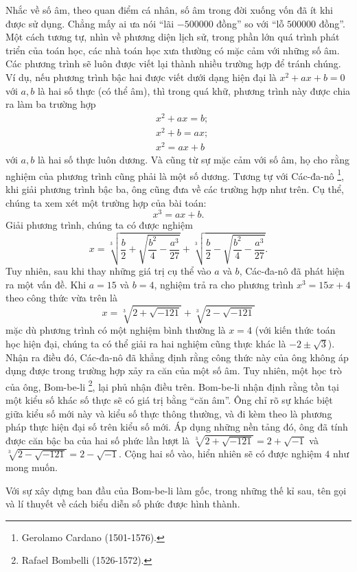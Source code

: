 \documentclass[a4paper, titlepage, openany]{book}
\newcommand\dblquote[1]{\textquotedblleft #1\textquotedblright}
\numberwithin{equation}{chapter}
\begin{document}
Nhắc về số âm, theo quan điểm cá nhân, số âm trong đời xuống vốn đã ít khi được sử dụng. Chẳng mấy ai ưa nói \dblquote{lãi $-500000$ đồng} so với \dblquote{lỗ $500000$ đồng}. Một cách tương tự, nhìn về phương diện lịch sử, trong phần lớn quá trình phát triển của toán học, các nhà toán học xưa thường có mặc cảm với những số âm. Các phương trình sẽ luôn được viết lại thành nhiều trường hợp để tránh chúng. Ví dụ, nếu phương trình bậc hai được viết dưới dạng hiện đại là $x^2 + ax+b=0$ với $a,b$ là hai số thực (có thể âm), thì trong quá khữ, phương trình này được chia ra làm ba trường hợp
\begin{align*}
   &x^2+ax = b;\\
   &x^2+b =ax;\\
   &x^2 =ax+b
\end{align*}
với $a,b$ là hai số thực luôn dương. Và cũng từ sự mặc cảm với số âm, họ cho rằng nghiệm của phương trình cũng phải là một số dương. Tương tự với Các-đa-nô \footnote{Gerolamo Cardano (1501-1576).}, khi giải phương trình bậc ba, ông cũng đưa về các trường hợp như trên. Cụ thể, chúng ta xem xét một trường hợp của bài toán: $$x^3 = ax+b.$$ Giải phương trình, chúng ta có được nghiệm $$x=\sqrt[3]{\frac{b}{2} + \sqrt{\frac{b^2}{4}-\frac{a^3}{27}}}+\sqrt[3]{\frac{b}{2} - \sqrt{\frac{b^2}{4}-\frac{a^3}{27}}}.$$ Tuy nhiên, sau khi thay những giá trị cụ thể vào $a$ và $b$, Các-đa-nô đã phát hiện ra một vấn đề. Khi $a=15$ và $b=4$, nghiệm trả ra cho phương trình $x^3 = 15x+4$ theo công thức vừa trên là $$x=\sqrt[3]{2+\sqrt{-121}}+\sqrt[3]{2-\sqrt{-121}}$$ mặc dù phương trình có một nghiệm bình thường là $x=4$ (với kiến thức toán học hiện đại, chúng ta có thể giải ra hai nghiệm cũng thực khác là $-2 \pm \sqrt{3}$). Nhận ra điều đó, Các-đa-nô đã khẳng định rằng công thức này của ông không áp dụng được trong trường hợp xảy ra căn của một số âm. Tuy nhiên, một học trò của ông, Bom-be-li \footnote{Rafael Bombelli (1526-1572).}, lại phủ nhận điều trên. Bom-be-li nhận định rằng tồn tại một kiểu số khác số thực sẽ có giá trị bằng \dblquote{căn âm}. Ông chỉ rõ sự khác biệt giữa kiểu số mới này và kiểu số thực thông thường, và đi kèm theo là phương pháp thực hiện đại số trên kiểu số mới. Áp dụng những nền tảng đó, ông đã tính được căn bậc ba của hai số phức lần lượt là $\sqrt[3]{2+\sqrt{-121}}=2+\sqrt{-1}$ và $\sqrt[3]{2-\sqrt{-121}}=2-\sqrt{-1}$. Cộng hai số vào, hiển nhiên sẽ có được nghiệm $4$ như mong muốn.

Với sự xây dựng ban đầu của Bom-be-li làm gốc, trong những thế kỉ sau, tên gọi và lí thuyết về cách biểu diễn số phức được hình thành.
\end{document}
